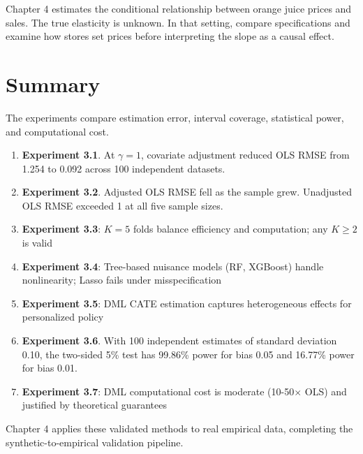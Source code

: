 Chapter 4 estimates the conditional relationship between orange juice prices and sales. The true elasticity is unknown. In that setting, compare specifications and examine how stores set prices before interpreting the slope as a causal effect.

\section{Summary}

The experiments compare estimation error, interval coverage, statistical power, and computational cost.

\begin{enumerate}
\item \textbf{Experiment 3.1}. At $\gamma=1$, covariate adjustment reduced OLS RMSE from 1.254 to 0.092 across 100 independent datasets.

\item \textbf{Experiment 3.2}. Adjusted OLS RMSE fell as the sample grew. Unadjusted OLS RMSE exceeded 1 at all five sample sizes.

\item \textbf{Experiment 3.3}: $K=5$ folds balance efficiency and computation; any $K \geq 2$ is valid

\item \textbf{Experiment 3.4}: Tree-based nuisance models (RF, XGBoost) handle nonlinearity; Lasso fails under misspecification

\item \textbf{Experiment 3.5}: DML CATE estimation captures heterogeneous effects for personalized policy

\item \textbf{Experiment 3.6}. With 100 independent estimates of standard deviation 0.10, the two-sided 5\% test has 99.86\% power for bias 0.05 and 16.77\% power for bias 0.01.

\item \textbf{Experiment 3.7}: DML computational cost is moderate (10-50$\times$ OLS) and justified by theoretical guarantees
\end{enumerate}

%

Chapter 4 applies these validated methods to real empirical data, completing the synthetic-to-empirical validation pipeline.

